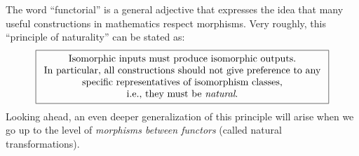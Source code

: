     

The word ``functorial'' is a general adjective that expresses the idea
that many useful constructions in mathematics respect morphisms. Very
roughly, this ``principle of naturality'' can be stated as: 
\begin{gather*}
    \boxed{\begin{array}{c}
    \text{Isomorphic inputs must produce isomorphic outputs.}\\
    \text{In particular, all constructions should not give preference to any}\\ \text{specific representatives of isomorphism classes,}\\
    \text{i.e., they must be \emph{natural}.}
    \end{array}}
\end{gather*}
Looking ahead, an even deeper generalization of this principle will arise when we go up to the level of \emph{morphisms between functors} (called natural transformations).

